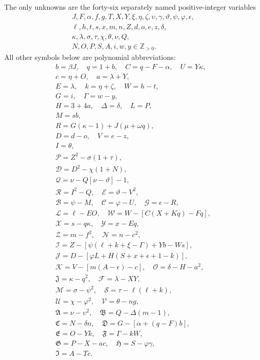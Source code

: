The only unknowns are the forty-six separately named positive-integer variables
\[
\begin{gathered}J,F,\alpha,f,g,T,X,Y,\xi,\eta,\zeta,\upsilon,\gamma,\vartheta,\psi,\varphi,\epsilon,\\
\ell,h,t,s,x,m,n,Z,d,o,e,z,\delta,\\
\kappa,\lambda,\sigma,\tau,\chi,\theta,\nu,Q,\\
N,O,P,S,A,i,w,y\in\mathbb Z_{>0}.\end{gathered}
\]
All other symbols below are polynomial abbreviations:
\[
\begin{gathered}
b=\beta J,\quad q=1+b,\quad C=q-F-\alpha,\quad U=Y\kappa,\\
c=\eta+O,\quad a=\lambda+Y,\\
E=\lambda,\quad k=\eta+\zeta,\quad W=h-t,\\
G=i,\quad\Gamma=w-y,\\
H=3+4a,\quad\Delta=\delta,\quad L=P,\\
M=sb,\\
R=G(\kappa-1)+J(\mu+\omega q),\\
D=d-o,\quad V=e-z,\\
I=\theta,\\
\mathcal{P}=Z^2-\sigma(1+\tau),\\
\mathcal{D}=D^2-\chi(1+N),\\
\mathcal{Q}=\nu-Q[\nu-\vartheta]-1,\\
\mathcal{R}=I^2-Q,\quad \mathcal{E}=\vartheta-V^2,\\
\mathcal{B}=\psi-M,\quad \mathcal{C}=\varphi-U,\quad \mathcal{G}=\epsilon-R,\\
\mathcal{L}=\ell-EO,\quad \mathcal{W}=W-[C(X+Kq)-Fq],\\
\mathcal{X}=s-q\kappa,\quad \mathcal{Y}=x-Eq,\\
\mathcal{Z}=m-f^2,\quad \mathcal{N}=n-c^2,\\
\mathcal{I}=Z-[\psi(\ell+k+\xi-\Gamma)+Yb-Ws],\\
\mathcal{J}=D-[\varphi L+H(S+x+\epsilon+1-k)],\\
\mathcal{K}=V-[m(A-\epsilon)-c],\quad\mathcal{O}=\delta-H-a^2,\\
\mathfrak{J}=\kappa-q^2,\quad\mathcal{F}=\lambda-XY,\\
\mathcal{M}=\sigma-\psi^2,\quad\mathcal{S}=\tau-\ell(\ell+k),\\
\mathcal{U}=\chi-\varphi^2,\quad\mathcal{V}=\theta-ng,\\
\mathfrak{A}=\nu-\upsilon^2,\quad\mathfrak{B}=Q-\Delta(m-1),\\
\mathfrak{C}=N-\delta n,\quad\mathfrak{D}=G-[\alpha+(q-F)b],\\
\mathfrak{E}=O-Yk,\quad\mathfrak{F}=\Gamma-kW,\\
\mathfrak{G}=P-X-ac,\quad\mathfrak{H}=S-\varphi\gamma,\\
\mathfrak{I}=A-Tc.
\end{gathered}
\]

